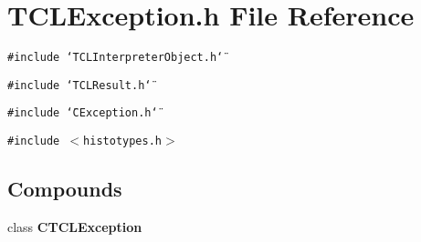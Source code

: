 \section{TCLException.h File Reference}
\label{TCLException_8h}
{\tt \#include \char`\"{}TCLInterpreter\-Object.h\char`\"{}}\par
{\tt \#include \char`\"{}TCLResult.h\char`\"{}}\par
{\tt \#include \char`\"{}CException.h\char`\"{}}\par
{\tt \#include $<$histotypes.h$>$}\par
\subsection*{Compounds}
\begin{CompactItemize}
\item 
class {\bf CTCLException}
\end{CompactItemize}
